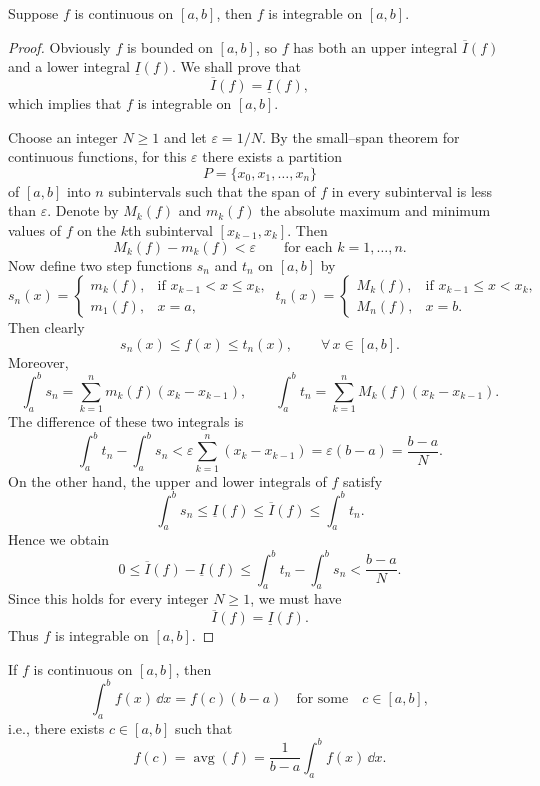 \documentclass[a4paper]{ctexart}
\begin{document}
	\begin{mythm}
		Suppose $f$ is continuous on $[a,b]$, then $f$ is integrable on $[a,b]$.
	\end{mythm}
	\begin{proof}
	Obviously $f$ is bounded on $[a,b]$, so $f$ has both an upper integral $\overline{I}(f)$ and a lower integral $\underline{I}(f)$. We shall prove that
	\[
	\overline{I}(f)=\underline{I}(f),
	\]
	which implies that $f$ is integrable on $[a,b]$.

	Choose an integer $N\ge 1$ and let $\varepsilon=1/N$. By the small--span theorem for continuous functions, for this $\varepsilon$ there exists a partition
	\[
	P=\{x_0, x_1,\dots,x_n\}
	\]
	of $[a,b]$ into $n$ subintervals such that the span of $f$ in every subinterval	is less than $\varepsilon$. Denote by $M_k(f)$ and $m_k(f)$ the absolute maximum
	and minimum values of $f$ on the $k$th subinterval $[x_{k-1},x_k]$. Then
	\[
	M_k(f)-m_k(f) < \varepsilon
	\qquad \text{for each } k=1,\dots,n.
	\]
	Now define two step functions $s_n$ and $t_n$ on $[a,b]$ by
	\[
	s_n(x)=
	\begin{cases}
	m_k(f), & \text{if } x_{k-1}<x\le x_k,\\[4pt]
	m_1(f), & x=a,
	\end{cases}
	\ 
	t_n(x)=
	\begin{cases}
	M_k(f), & \text{if } x_{k-1}\le x < x_k,\\[4pt]
	M_n(f), & x=b.
	\end{cases}
	\]
	Then clearly
	\[
	s_n(x)\le f(x)\le t_n(x), \qquad \forall\, x\in[a,b].
	\]
	Moreover,
	\[
	\int_a^b s_n
	= \sum_{k=1}^n m_k(f)(x_k-x_{k-1}), 
	\qquad
	\int_a^b t_n
	= \sum_{k=1}^n M_k(f)(x_k-x_{k-1}).
	\]
	The difference of these two integrals is
	\[
	\int_a^b t_n - \int_a^b s_n
	< \varepsilon \sum_{k=1}^n (x_k-x_{k-1})
	= \varepsilon(b-a)
	= \frac{b-a}{N}.
	\]
	On the other hand, the upper and lower integrals of $f$ satisfy
	\[
	\int_a^b s_n \le \underline{I}(f) \le \overline{I}(f) 
	\le \int_a^b t_n.
	\]
	Hence we obtain
	\[
	0 \le \overline{I}(f) - \underline{I}(f)
	\le \int_a^b t_n - \int_a^b s_n
	< \frac{b-a}{N}.
	\]
	Since this holds for every integer $N\ge 1$, we must have
	\[
	\overline{I}(f)=\underline{I}(f).
	\]
	Thus $f$ is integrable on $[a,b]$.
	\end{proof}
	\begin{mythm}
		If $f$ is continuous on $[a,b]$, then
		\[
		\int_a^b f(x)\, \dd x= f(c)(b-a) \quad \text{for some}\quad c\in [a,b],
		\]
		i.e., there exists $c\in [a,b]$ such that
		\[
		f(c)=\operatorname{avg}(f)=\frac{1}{b-a}\int_a^b f(x)\, \dd x.
		\]
	\end{mythm}
\end{document}
